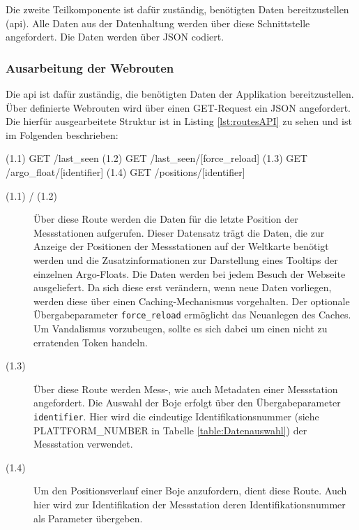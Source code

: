 Die zweite Teilkomponente ist dafür zuständig, benötigten Daten bereitzustellen (\gls{api}). Alle Daten aus der Datenhaltung werden über diese Schnittstelle angefordert. Die Daten werden über JSON codiert.


\subsubsection{Ausarbeitung der Webrouten} \label{sec:entwurfRoutes}


Die \gls{api} ist dafür zuständig, die benötigten Daten der Applikation bereitzustellen. Über definierte Webrouten wird über einen GET-Request ein JSON angefordert. Die  hierfür ausgearbeitete Struktur ist in Listing \ref{lst:routesAPI} zu sehen und ist im Folgenden beschrieben:

\begin{python}[label={lst:routesAPI}, caption={Webrouten der Datenrepresentation}]
(1.1) GET     /last_seen
(1.2) GET     /last_seen/[force_reload]
(1.3) GET     /argo_float/[identifier]
(1.4) GET     /positions/[identifier]
\end{python}

\begin{description}
 \item [(1.1) / (1.2)]
    Über diese Route  werden die Daten für die letzte Position der Messstationen aufgerufen. Dieser Datensatz trägt die Daten, die zur Anzeige der Positionen der Messstationen auf der Weltkarte benötigt werden und die Zusatzinformationen zur Darstellung eines Tooltips der einzelnen Argo-Floats. Die Daten werden bei jedem Besuch der Webseite ausgeliefert. Da sich diese erst verändern, wenn neue Daten vorliegen, werden diese über einen Caching-Mechanismus vorgehalten. Der optionale Übergabeparameter \texttt{force\_reload} ermöglicht das Neuanlegen des Caches. Um Vandalismus vorzubeugen, sollte es sich dabei um einen nicht zu  erratenden Token handeln.

 \item [(1.3)]
    Über diese Route werden Mess-, wie auch  Metadaten einer Messstation angefordert. Die Auswahl der Boje erfolgt über den Übergabeparameter \texttt{identifier}. Hier wird die eindeutige Identifikationsnummer  (siehe PLATTFORM\-\_NUMBER in Tabelle \ref{table:Datenauswahl}) der Messstation verwendet.

 \item [(1.4)]
    Um den Positionsverlauf einer Boje anzufordern, dient diese Route. Auch hier wird zur Identifikation der Messstation deren Identifikationsnummer als Parameter übergeben.
\end{description}



